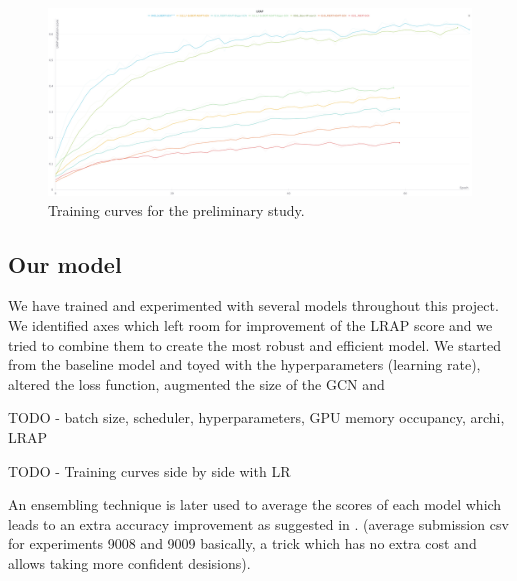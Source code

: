 \begin{figure}[ht]
    \centering
    \includegraphics[width=1.\textwidth]{figures/preliminary_study.png}
    \caption{Training curves for the preliminary study.}
    \label{fig:preliminary_study_curves}
\end{figure}



\subsection*{Our model}
\label{sec:our model}
We have trained and experimented with several models throughout this project. We identified axes which left room for improvement of the LRAP score and we tried to combine them to create the most robust and efficient model. We started from the baseline model and toyed with the hyperparameters (learning rate), altered the loss function, augmented the size of the GCN and 

\color{red}TODO - batch size, scheduler, hyperparameters, GPU memory occupancy, archi, LRAP \color{black}

\color{red}TODO - Training curves side by side with LR \color{black}

An ensembling technique is later used to average the scores of each model which leads to an extra accuracy improvement as suggested in \cite{text2mol}. (average submission csv for experiments 9008 and 9009 basically, a trick which has no extra cost and allows taking more confident desisions).